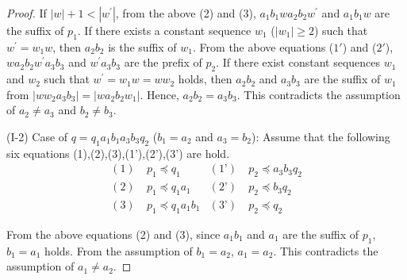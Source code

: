 \begin{proof}
If $|w|+1 < |w^{\prime}|$, from the above (2) and (3), 
$a_{1}b_{1}wa_{2}b_{2}w^{\prime}$ and $a_{1}b_{1}w$ are the suffix of $p_{1}$.
If there exists a constant sequence $w_{1}$ ($|w_{1}|\geq 2$) such that $w^{\prime}=w_{1}w$, then $a_{2}b_{2}$ is the suffix of $w_{1}$.
%
From  the above equations ($1'$) and ($2'$), 
$wa_{2}b_{2}w^{\prime}a_{3}b_{3}$ and $w^{\prime}a_{3}b_{3}$ are the prefix of $p_{2}$.
If there exist constant sequences $w_{1}$ and $w_{2}$ such that $w^{\prime} = w_{1}w=ww_{2}$ holds, then $a_{2}b_{2}$ and $a_{3}b_{3}$ are the suffix of $w_{1}$ from $|ww_{2}a_{3}b_{3}|=|wa_{2}b_{2}w_{1}|$.
Hence, $a_{2}b_{2}=a_{3}b_{3}$.
This contradicts the assumption of $a_{2} \ne a_{3}$ and $b_{2} \ne b_{3}$.
\smallskip

\noindent
(I-2) Case of $q=q_{1}a_{1}b_{1}a_{3}b_{3}q_{2}$ ($b_{1}=a_{2}$ and $a_{3}=b_{2}$):
Assume that the following six equations (1),(2),(3),(1'),(2'),(3') are hold.
\begin{align*}
(1)~& p_{1} \preceq q_{1} & (\text{1'})~& p_{2} \preceq a_{3}b_{3}q_{2} \\
(2)~& p_{1} \preceq q_{1}a_{1} & (\text{2'})~& p_{2} \preceq b_{3}q_{2} \\
(3)~& p_{1} \preceq q_{1}a_{1}b_{1} & (\text{3'})~& p_{2} \preceq q_{2}
\end{align*}

\noindent
From the above equations (2) and (3), since $a_{1}b_{1}$ and $a_{1}$ are the suffix of $p_{1}$, 
$b_{1} = a_{1}$ holds.
From the assumption of $b_{1}=a_{2}$, $a_{1}=a_{2}$.
This contradicts the assumption of $a_{1}\not= a_{2}$.
\smallskip


\end{proof}
